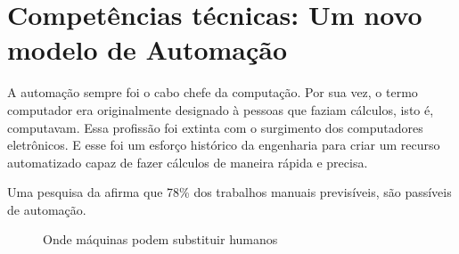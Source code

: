 \documentclass[
	12pt,				%
	openright,			%
	oneside,			%
	a4paper,			%
    tikz,
	english,			%
	french,				%
	spanish,			%
	brazil				%
	]{abntex2}
\begin{document}
\chapter{Competências técnicas: Um novo modelo de Automação}

A automação sempre foi o cabo chefe da computação. Por sua vez,
o termo computador era originalmente designado à pessoas que
faziam cálculos, isto é, computavam. Essa profissão foi extinta
com o surgimento dos computadores eletrônicos. E esse foi um
esforço histórico da engenharia para criar um recurso automatizado
capaz de fazer cálculos de maneira rápida e precisa.

\par

Uma pesquisa da \hbox{\cite{McKinseyAutomacao}} afirma que 78\% dos
trabalhos manuais previsíveis, são passíveis de automação.

\par

\begin{figure}[htb]\centering
    \begin{minipage}{\textwidth}
        \centering
        \caption{Onde máquinas podem substituir humanos}
    \end{minipage}
\end{figure}
\end{document}
